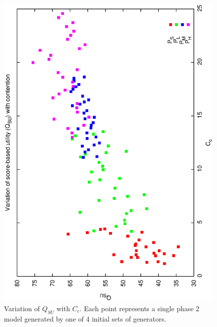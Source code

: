 \begin{figure}[h]
\begin{center}
 \includegraphics[scale=0.5, angle=-90]{figures/p2_gen_qsu.eps}
 \caption[Variation of $Q_{SU}$ with $C_C$ for variable phase2 generator models.] 
   {Variation of $Q_{SU}$ with $C_c$. Each point represents a single phase 2 model generated by one of 4 initial sets of generators.}
\end{center}
\label{fig:p2_gen_su}
\end{figure}


